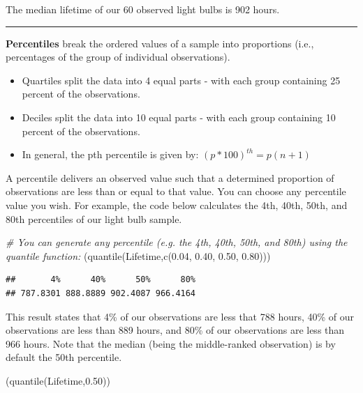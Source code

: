 \documentclass[
]{book}
\newenvironment{Shaded}{\begin{snugshade}}{\end{snugshade}}
\newcommand{\CommentTok}[1]{\textcolor[rgb]{0.56,0.35,0.01}{\textit{#1}}}
\newcommand{\FloatTok}[1]{\textcolor[rgb]{0.00,0.00,0.81}{#1}}
\newcommand{\FunctionTok}[1]{\textcolor[rgb]{0.00,0.00,0.00}{#1}}
\newcommand{\NormalTok}[1]{#1}
\begin{document}
The median lifetime of our 60 observed light bulbs is 902 hours.

\begin{center}\rule{0.5\linewidth}{0.5pt}\end{center}

\textbf{Percentiles} break the ordered values of a sample into proportions (i.e., percentages of the group of individual observations).

\begin{itemize}
\item
  Quartiles split the data into 4 equal parts - with each group containing 25 percent of the observations.
\item
  Deciles split the data into 10 equal parts - with each group containing 10 percent of the observations.
\item
  In general, the pth percentile is given by: \((p * 100)^{th}=p(n+1)\)
\end{itemize}

A percentile delivers an observed value such that a determined proportion of observations are less than or equal to that value. You can choose any percentile value you wish. For example, the code below calculates the 4th, 40th, 50th, and 80th percentiles of our light bulb sample.

\begin{Shaded}
\begin{Highlighting}[]
\CommentTok{\# You can generate any percentile (e.g. the 4th, 40th, 50th, and 80th) using the quantile function:}
\NormalTok{(}\FunctionTok{quantile}\NormalTok{(Lifetime,}\FunctionTok{c}\NormalTok{(}\FloatTok{0.04}\NormalTok{, }\FloatTok{0.40}\NormalTok{, }\FloatTok{0.50}\NormalTok{, }\FloatTok{0.80}\NormalTok{)))}
\end{Highlighting}
\end{Shaded}

\begin{verbatim}
##       4%      40%      50%      80% 
## 787.8301 888.8889 902.4087 966.4164
\end{verbatim}

This result states that 4\% of our observations are less that 788 hours, 40\% of our observations are less than 889 hours, and 80\% of our observations are less than 966 hours. Note that the median (being the middle-ranked observation) is by default the 50th percentile.

\begin{Shaded}
\begin{Highlighting}[]
\NormalTok{(}\FunctionTok{quantile}\NormalTok{(Lifetime,}\FloatTok{0.50}\NormalTok{))}
\end{Highlighting}
\end{Shaded}
\end{document}
